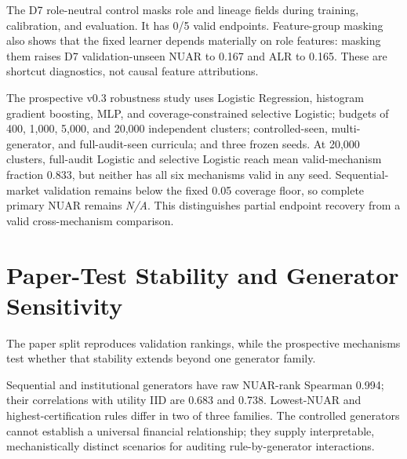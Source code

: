 \begin{table}[t]
  \caption{Holm-adjusted D2--D7 versus D1 validation contrasts. Delta NUAR is \textit{N/A} because no candidate/reference pair has valid endpoints in the same seed.}
  \label{tab:training_holm}
  \centering
  \benchmarktableformat
  
\end{table}

The D7 role-neutral control masks role and lineage fields during training, calibration, and evaluation. It has 0/5 valid endpoints. Feature-group masking also shows that the fixed learner depends materially on role features: masking them raises D7 validation-unseen NUAR to 0.167 and ALR to 0.165. These are shortcut diagnostics, not causal feature attributions.

The prospective v0.3 robustness study uses Logistic Regression, histogram gradient boosting, MLP, and coverage-constrained selective Logistic; budgets of 400, 1,000, 5,000, and 20,000 independent clusters; controlled-seen, multi-generator, and full-audit-seen curricula; and three frozen seeds. At 20,000 clusters, full-audit Logistic and selective Logistic reach mean valid-mechanism fraction 0.833, but neither has all six mechanisms valid in any seed. Sequential-market validation remains below the fixed 0.05 coverage floor, so complete primary NUAR remains \textit{N/A}. This distinguishes partial endpoint recovery from a valid cross-mechanism comparison.

\section{Paper-Test Stability and Generator Sensitivity}
The paper split reproduces validation rankings, while the prospective mechanisms test whether that stability extends beyond one generator family.

\begin{table}[t]
  \caption{Validation-to-paper and cross-generator rank stability. Constant certification ranks remain \textit{N/A} and are not shown.}
  \label{tab:scale_stability}
  \centering
  \benchmarktableformat
  
\end{table}

Sequential and institutional generators have raw NUAR-rank Spearman 0.994; their correlations with utility IID are 0.683 and 0.738. Lowest-NUAR and highest-certification rules differ in two of three families. The controlled generators cannot establish a universal financial relationship; they supply interpretable, mechanistically distinct scenarios for auditing rule-by-generator interactions.


